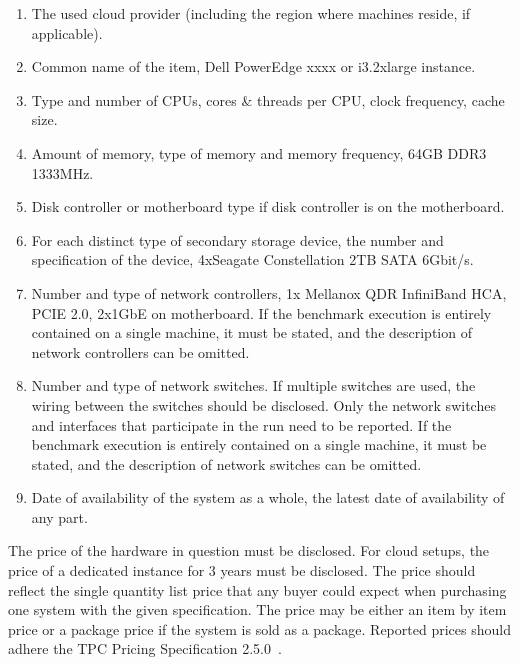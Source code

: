 \begin{enumerate}
    \item The used cloud provider (including the region where machines reside, if applicable).
    \item Common name of the item, \eg Dell PowerEdge xxxx or i3.2xlarge instance.
    \item Type and number of CPUs, cores \& threads per CPU, clock frequency, cache size.
    \item Amount of memory, type of memory and memory frequency, \eg 64GB DDR3 1333MHz.
    \item Disk controller or motherboard type if disk controller is on the motherboard.
    \item For each distinct type of secondary storage device, the number and specification of the device, \eg 4xSeagate Constellation 2TB SATA 6Gbit/s.
    \item Number and type of network controllers, \eg 1x Mellanox QDR InfiniBand HCA, PCIE 2.0, 2x1GbE on motherboard. If the benchmark execution is entirely contained on a single machine, it must be stated, and the description of network controllers can be omitted.
    \item Number and type of network switches. If multiple switches are used, the wiring between the switches should be disclosed.
    Only the network switches and interfaces that participate in the run need to be reported. If the benchmark execution is entirely contained on a single machine, it must be stated, and the description of network switches can be omitted.
    \item Date of availability of the system as a whole, \ie the latest date of availability of any part.
\end{enumerate}

The price of the hardware in question must be disclosed. For cloud setups, the price of a dedicated instance for 3 years must be disclosed. The price should reflect the single quantity list price that any buyer could expect when purchasing one system with the given specification. The price may be either an item by item price or a package price if the system is sold as a package.
Reported prices should adhere the TPC Pricing Specification 2.5.0~\cite{pricing,tpc-pricing}.

